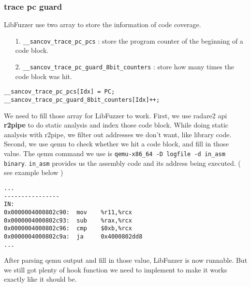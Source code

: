 \subsubsection{trace pc guard}

LibFuzzer use two array to store the information of code coverage.
\begin{enumerate}
    \item [1.] \texttt{\_\_sancov\_trace\_pc\_pcs} : store the program counter of the beginning of a code block.
    \item [2.] \texttt{\_\_sancov\_trace\_pc\_guard\_8bit\_counters} : store how many times the code block was hit.
\end{enumerate}

\begin{lstlisting}
__sancov_trace_pc_pcs[Idx] = PC;
__sancov_trace_pc_guard_8bit_counters[Idx]++;
\end{lstlisting}

We need to fill those array for LibFuzzer to work.
First, we use radare2 api \textbf{r2pipe} to do static analysis and index those code block.
While doing static analysis with r2pipe, we filter out addresses we don't want, like library code.
Second, we use qemu to check whether we hit a code block, and fill in those value.
The qemu command we use is \texttt{qemu-x86\_64 -D logfile -d in\_asm binary}.
\texttt{in\_asm} provides us the assembly code and its address being executed. ( see example below )

\begin{lstlisting}
...
----------------
IN:
0x0000004000802c90:  mov    %r11,%rcx
0x0000004000802c93:  sub    %rax,%rcx
0x0000004000802c96:  cmp    $0xb,%rcx
0x0000004000802c9a:  ja     0x4000802dd8
...
\end{lstlisting}

After parsing qemu output and fill in those value, LibFuzzer is now runnable.
But we still got plenty of hook function we need to implement to make it works exactly like it should be.
